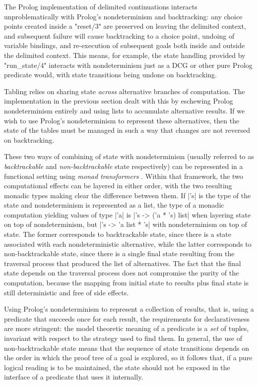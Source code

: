 The Prolog implementation of delimited continuations interacts unproblematically 
with Prolog's nondeterminism and backtracking: any choice points created inside a
"reset/3" are preserved on leaving the delimited context, and subsequent failure will
cause backtracking to a choice point, undoing of variable bindings, and re-execution of 
subsequent goals both inside and outside the delimited context. This means, for example,
the state handling provided by "run_state/4" interacts with nondeterminism just as
a DCG or other pure Prolog predicate would, with state transitions being undone on backtracking.

Tabling relies on sharing state \emph{across} alternative branches of computation.
The implementation in the previous section dealt with this by eschewing Prolog nondeterminism
entirely and using lists to accumulate alternative results.
If we wish to use Prolog's nondeterminism to represent these alternatives, then
the state of the tables must be managed in such a way that changes are not reversed on backtracking.

These two ways of combining of state with nondeterminism (usually referred to as \emph{backtrackable}
and \emph{non-backtrackable} state respectively) can be represented
in a functional setting using \emph{monad transformers} \citep{LiangHudakJones1995}.
Within that framework, the two computational effects can be
layered in either order, with the two resulting monadic types making clear the difference
between them. If |'s| is the type of the state and nondeterminism is represented as a list,
the type of a monadic computation yielding values of type |'a| is |'s -> ('a * 's) list| 
when layering state on top of nondeterminism, but
|'s -> 'a list * 's| with nondeterminism on top of state. The former corresponds to backtrackable 
state, since there is a state associated with each nondeterministic alternative, while the
latter corresponds to non-backtrackable state, since there is a single final state resulting from
the traversal process that produced the list of alternatives. The fact that the final state depends
on the traversal process does not compromise the purity of the computation, because the mapping
from initial state to results plus final state is still deterministic and free of side effects.

Using Prolog's nondeterminism to represent a collection of results, that is, using a predicate
that succeeds once for each result, the
requirements for declarativeness are more stringent: the model theoretic meaning of a predicate is
a \emph{set} of tuples, invariant with respect to the strategy used to find them.
In general, the use of non-backtrackable state means that the sequence of state transitions depends
on the order in which the proof tree of a goal is explored, so it follows that, if a pure logical
reading is to be maintained, the state
should not be exposed in the interface of a predicate that uses it internally.

